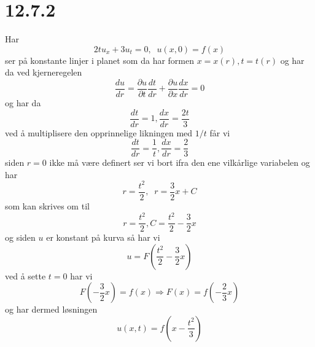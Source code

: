 \documentclass{report}
\newcommand{\nbrack}[1]{\left( #1 \right)}
\begin{document}
\section*{12.7.2}
Har
\begin{equation}
  \label{eq:58}
  2tu_{x} + 3u_{t} = 0, \;\; u(x, 0) = f(x)
\end{equation}
ser på konstante linjer i planet som da har formen $x = x(r), t = t(r)$ og har da ved kjerneregelen
\begin{equation}
  \label{eq:59}
  \frac{du}{dr} = \frac{\partial u}{\partial t} \frac{dt}{dr} + \frac{\partial u}{\partial x}\frac{dx}{dr} = 0
\end{equation}
og har da
\begin{equation}
  \label{eq:60}
  \frac{dt}{dr} = 1, \frac{dx}{dr} = \frac{2t}{3}
\end{equation}
ved å multiplisere den opprinnelige likningen med $1/t$ får vi
\begin{equation}
  \label{eq:62}
  \frac{dt}{dr} = \frac{1}{t}, \frac{dx}{dr} = \frac{2}{3}
\end{equation}
siden $r=0$ ikke må være definert ser vi bort ifra den ene vilkårlige variabelen og har
\begin{equation}
  \label{eq:63}
  r = \frac{t^{2}}{2}, \;\; r = \frac{3}{2}x + C
\end{equation}
som kan skrives om til
\begin{equation}
  \label{eq:64}
  r = \frac{t^{2}}{2}, C = \frac{t^{2}}{2} - \frac{3}{2}x
\end{equation}
og siden $u$ er konstant på kurva så har vi
\begin{equation}
  \label{eq:65}
  u = F\nbrack{ \frac{t^{2}}{2} - \frac{3}{2}x }
\end{equation}
ved å sette $t=0$ har vi
\begin{equation}
  \label{eq:66}
  F\nbrack{ -\frac{3}{2}x } = f(x) \Rightarrow F(x) = f\nbrack{-\frac{2}{3} x}
\end{equation}
og har dermed løsningen
\begin{equation}
  \label{eq:67}
  u(x, t) = f\nbrack{ x - \frac{t^{2}}{3} }
\end{equation}
\end{document}
